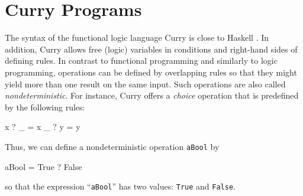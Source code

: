 \documentclass{llncs}
\newcommand{\code}[1]{\mbox{\small\texttt{#1}}}
\newcommand{\ccode}[1]{``\code{#1}''}
\begin{document}
\section{Curry Programs}
\label{sec:Curry}

The syntax of the functional logic language Curry \cite{Hanus06Curry}
is close to Haskell \cite{PeytonJones03Haskell}.
In addition, Curry allows free (logic) 
variables in conditions and right-hand sides of defining rules.
In contrast to functional programming and similarly to logic programming,
operations can be defined by overlapping rules so that
they might yield more than one result on the same input.
Such operations are also called \emph{nondeterministic}.
For instance, Curry offers a \emph{choice} operation that is predefined by
the following rules:
%
\begin{curry}
  x ? _ = x
  _ ? y = y
\end{curry}
%
Thus, we can define a nondeterministic operation \code{aBool} by
\label{ex:aBool}
%
\begin{curry}
  aBool = True ? False
\end{curry}
%
so that the expression \ccode{aBool} has two values:
\code{True} and \code{False}.
\end{document}
